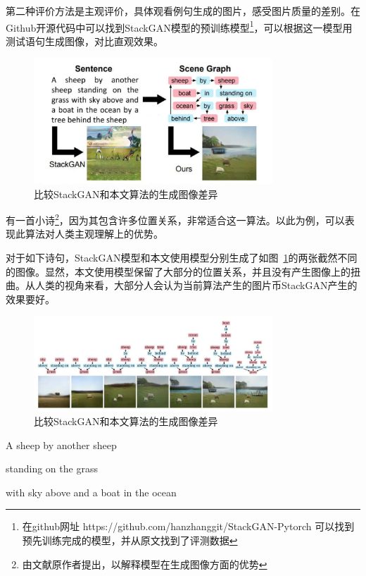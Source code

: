 第二种评价方法是主观评价，具体观看例句生成的图片，感受图片质量的差别。在Github开源代码中可以找到StackGAN模型的预训练模型\footnote{在github网址 https://github.com/hanzhanggit/StackGAN-Pytorch 可以找到预先训练完成的模型，并从原文找到了评测数据}，可以根据这一模型用测试语句生成图像，对比直观效果。

\begin{figure}[!htb]
    \centering
    \includegraphics[width=0.8\textwidth]{figures/sg2imcp.png}
    \caption{比较StackGAN和本文算法的生成图像差异}
    \label{fig:sg2imcp}
\end{figure}

有一首小诗\footnote{由文献\cite{Johnson_2018}原作者提出，以解释模型在生成图像方面的优势}，因为其包含许多位置关系，非常适合这一算法。以此为例，可以表现此算法对人类主观理解上的优势。

对于如下诗句，StackGAN模型和本文使用模型分别生成了如图~\ref{fig:sg2imcp}的两张截然不同的图像。显然，本文使用模型保留了大部分的位置关系，并且没有产生图像上的扭曲。从人类的视角来看，大部分人会认为当前算法产生的图片币StackGAN产生的效果要好。

\begin{figure}[!htbp]
    \centering
    \includegraphics[width=0.8\textwidth]{figures/sg2imeg.png}
    \caption{比较StackGAN和本文算法的生成图像差异}
    \label{fig:sg2imeg}
\end{figure}

A sheep by another sheep

standing on the grass

with sky above and a boat in the ocean


